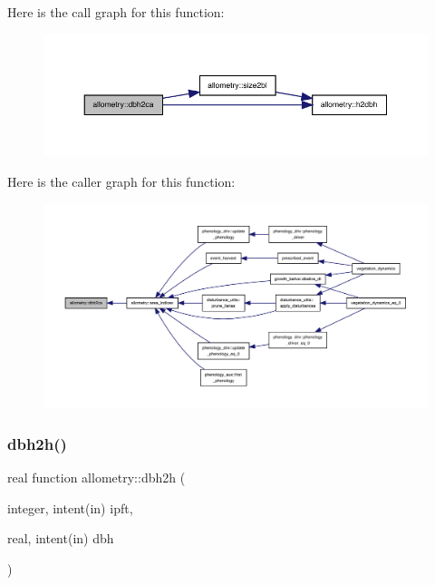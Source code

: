 Here is the call graph for this function\+:
\nopagebreak
\begin{figure}[H]
\begin{center}
\leavevmode
\includegraphics[width=350pt]{namespaceallometry_abacdf8e8e585ce8d788a1fc2be133243_cgraph}
\end{center}
\end{figure}
Here is the caller graph for this function\+:
\nopagebreak
\begin{figure}[H]
\begin{center}
\leavevmode
\includegraphics[width=350pt]{namespaceallometry_abacdf8e8e585ce8d788a1fc2be133243_icgraph}
\end{center}
\end{figure}
\mbox{\label{namespaceallometry_a56f11dc07da4d5e7114dc37d6cc5f2cc}} 
\subsubsection{\texorpdfstring{dbh2h()}{dbh2h()}}
{\footnotesize\ttfamily real function allometry\+::dbh2h (\begin{DoxyParamCaption}\item[{integer, intent(in)}]{ipft,  }\item[{real, intent(in)}]{dbh }\end{DoxyParamCaption})}

